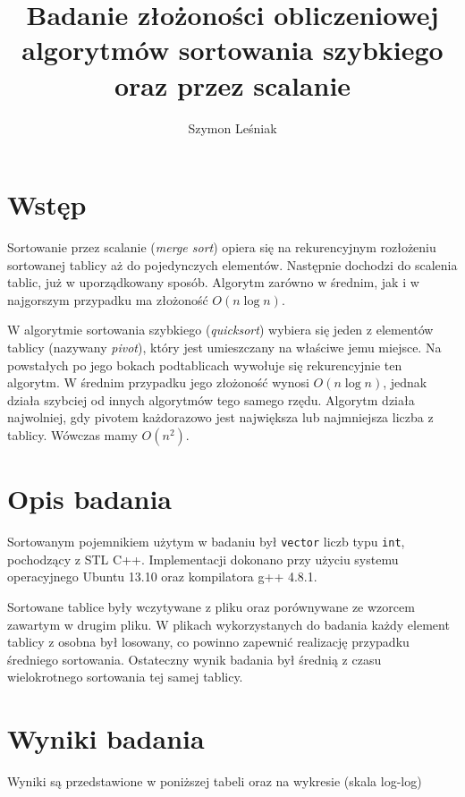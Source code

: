\documentclass[a4paper,10pt]{article}
\title{Badanie złożoności obliczeniowej algorytmów sortowania szybkiego
oraz przez scalanie}
\author{Szymon Leśniak}
\begin{document}
\maketitle

\section{Wstęp}

\par Sortowanie przez scalanie (\textit{merge sort}) opiera się na 
rekurencyjnym rozłożeniu sortowanej tablicy aż do pojedynczych elementów. 
Następnie dochodzi do scalenia tablic, już w uporządkowany sposób. Algorytm zarówno w średnim,
jak i w najgorszym przypadku ma złożoność \(O(n \log n)\).

\par W algorytmie sortowania szybkiego (\textit{quicksort}) wybiera się jeden
z elementów tablicy (nazywany \textit{pivot}), który jest umieszczany 
na właściwe jemu miejsce. Na powstałych po jego bokach podtablicach wywołuje
się rekurencyjnie ten algorytm. W średnim przypadku jego złożoność wynosi 
\(O(n \log n)\), jednak działa szybciej od innych algorytmów tego samego rzędu.
Algorytm działa najwolniej, gdy pivotem każdorazowo jest największa lub 
najmniejsza liczba z tablicy. Wówczas mamy \(O(n^2)\).

\section{Opis badania}

\par Sortowanym pojemnikiem użytym w badaniu był \verb+vector+ liczb typu
\verb+int+, pochodzący z STL C++. Implementacji 
dokonano przy użyciu systemu operacyjnego Ubuntu 13.10 oraz 
kompilatora g++ 4.8.1.

\par Sortowane tablice były wczytywane z pliku oraz porównywane ze wzorcem
zawartym w drugim pliku. W plikach wykorzystanych do badania każdy 
element tablicy z osobna był losowany, co powinno zapewnić realizację
przypadku średniego sortowania. Ostateczny wynik badania był średnią
z czasu wielokrotnego sortowania tej samej tablicy.

\section{Wyniki badania}

\par Wyniki są przedstawione w poniższej tabeli oraz na wykresie (skala 
log-log) 
\end{document}
